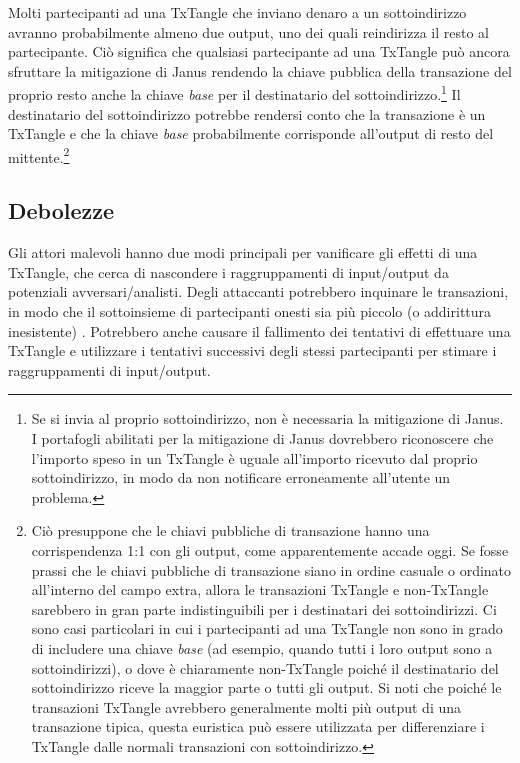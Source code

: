 Molti partecipanti ad una TxTangle che inviano denaro a un sottoindirizzo avranno probabilmente almeno due output, uno dei quali reindirizza il resto al partecipante. Ciò significa che qualsiasi partecipante ad una TxTangle può ancora sfruttare la mitigazione di Janus rendendo la chiave pubblica della transazione del proprio resto anche la chiave \emph{base} per il destinatario del sottoindirizzo.\footnote{Se si invia al proprio sottoindirizzo, non è necessaria la mitigazione di Janus. I portafogli abilitati per la mitigazione di Janus dovrebbero riconoscere che l'importo speso in un TxTangle è uguale all'importo ricevuto dal proprio sottoindirizzo, in modo da non notificare erroneamente all'utente un problema.} Il destinatario del sottoindirizzo potrebbe rendersi conto che la transazione è un TxTangle e che la chiave \emph{base} probabilmente corrisponde all'output di resto del mittente.\footnote{Ciò presuppone che le chiavi pubbliche di transazione hanno una corrispendenza 1:1 con gli output, come apparentemente accade oggi. Se fosse prassi che le chiavi pubbliche di transazione siano in ordine casuale o ordinato all'interno del campo extra, allora le transazioni TxTangle e non-TxTangle sarebbero in gran parte indistinguibili per i destinatari dei sottoindirizzi. Ci sono casi particolari in cui i partecipanti ad una TxTangle non sono in grado di includere una chiave \emph{base} (ad esempio, quando tutti i loro output sono a sottoindirizzi), o dove è chiaramente non-TxTangle poiché il destinatario del sottoindirizzo riceve la maggior parte o tutti gli output. Si noti che poiché le transazioni TxTangle avrebbero generalmente molti più output di una transazione tipica, questa euristica può essere utilizzata per differenziare i TxTangle dalle normali transazioni con sottoindirizzo.}


\subsection{Debolezze}
\label{subsec:weaknesses-txtangle}

Gli attori malevoli hanno due modi principali per vanificare gli effetti di una TxTangle, che cerca di nascondere i raggruppamenti di input/output da potenziali avversari/analisti. Degli attaccanti potrebbero inquinare le transazioni, in modo che il sottoinsieme di partecipanti onesti sia più piccolo (o addirittura inesistente) \cite{coinjoin-pollution}. Potrebbero anche causare il fallimento dei tentativi di effettuare una TxTangle e utilizzare i tentativi successivi degli stessi partecipanti per stimare i raggruppamenti di input/output.

